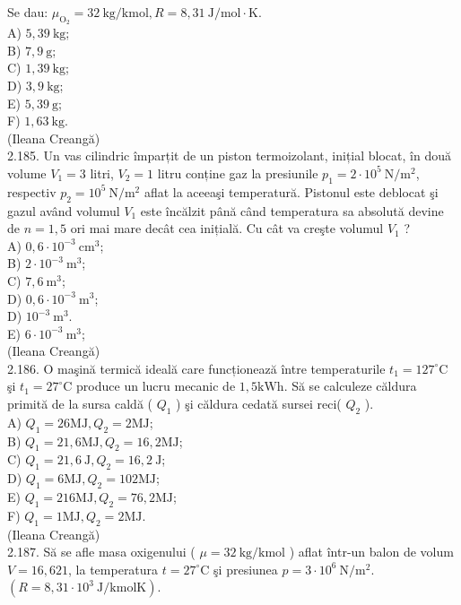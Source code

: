 \documentclass[10pt]{article}
\begin{document}
Se dau: $\mu_{\mathrm{O}_{2}}=32 \mathrm{~kg} / \mathrm{kmol}, R=8,31 \mathrm{~J} / \mathrm{mol} \cdot \mathrm{K}$.\\
A) $5,39 \mathrm{~kg}$;\\
B) $7,9 \mathrm{~g}$;\\
C) $1,39 \mathrm{~kg}$;\\
D) $3,9 \mathrm{~kg}$;\\
E) $5,39 \mathrm{~g}$;\\
F) $1,63 \mathrm{~kg}$.\\
(Ileana Creangă)\\
2.185. Un vas cilindric împarțit de un piston termoizolant, inițial blocat, în două volume $V_{1}=3$ litri, $V_{2}=1$ litru conține gaz la presiunile $p_{1}=2 \cdot 10^{5} \mathrm{~N} / \mathrm{m}^{2}$, respectiv $p_{2}=10^{5} \mathrm{~N} / \mathrm{m}^{2}$ aflat la aceeaşi temperatură. Pistonul este deblocat şi gazul având volumul $V_{1}$ este încălzit până când temperatura sa absolută devine de $n=1,5$ ori mai mare decât cea inițială. Cu cât va creşte volumul $V_{1}$ ?\\
A) $0,6 \cdot 10^{-3} \mathrm{~cm}^{3}$;\\
B) $2 \cdot 10^{-3} \mathrm{~m}^{3}$;\\
C) $7,6 \mathrm{~m}^{3}$;\\
D) $0,6 \cdot 10^{-3} \mathrm{~m}^{3}$;\\
D) $10^{-3} \mathrm{~m}^{3}$.\\
E) $6 \cdot 10^{-3} \mathrm{~m}^{3}$;\\
(Ileana Creangă)\\
2.186. O maşină termică ideală care funcționează între temperaturile $t_{1}=127^{\circ} \mathrm{C}$ şi $t_{1}=27^{\circ} \mathrm{C}$ produce un lucru mecanic de $1,5 \mathrm{kWh}$. Să se calculeze căldura primită de la sursa caldă ( $Q_{1}$ ) şi căldura cedată sursei reci( $Q_{2}$ ).\\
A) $Q_{1}=26 \mathrm{MJ}, Q_{2}=2 \mathrm{MJ}$;\\
B) $Q_{1}=21,6 \mathrm{MJ}, Q_{2}=16,2 \mathrm{MJ}$;\\
C) $Q_{1}=21,6 \mathrm{~J}, Q_{2}=16,2 \mathrm{~J}$;\\
D) $Q_{1}=6 \mathrm{MJ}, Q_{2}=102 \mathrm{MJ}$;\\
E) $Q_{1}=216 \mathrm{MJ}, Q_{2}=76,2 \mathrm{MJ}$;\\
F) $Q_{1}=1 \mathrm{MJ}, Q_{2}=2 \mathrm{MJ}$.\\
(Ileana Creangă)\\
2.187. Să se afle masa oxigenului ( $\mu=32 \mathrm{~kg} / \mathrm{kmol}$ ) aflat într-un balon de volum $V=16,621$, la temperatura $t=27^{\circ} \mathrm{C}$ şi presiunea $p=3 \cdot 10^{6} \mathrm{~N} / \mathrm{m}^{2}$. $\left(R=8,31 \cdot 10^{3} \mathrm{~J} / \mathrm{kmolK}\right)$.\\
\end{document}
